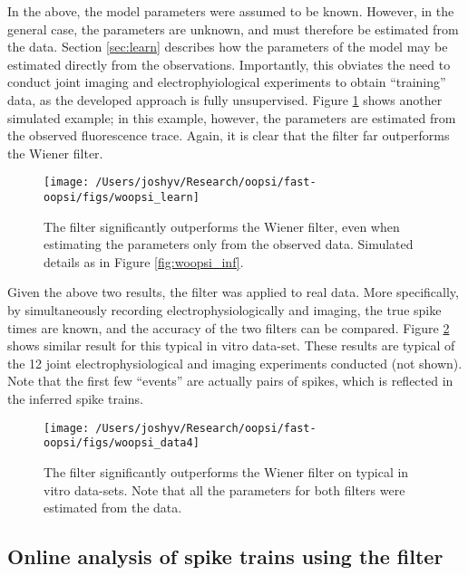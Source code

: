 In the above, the model parameters were assumed to be known.  However, in the general case, the parameters are unknown, and must therefore be estimated from the data.  Section \ref{sec:learn} describes how the parameters of the model may be estimated directly from the observations.  Importantly, this obviates the need to conduct joint imaging and electrophyiological experiments to obtain ``training'' data, as the developed approach is fully unsupervised.  Figure \ref{fig:woopsi_learn} shows another simulated example; in this example, however, the parameters are estimated from the observed fluorescence trace.  Again, it is clear that the \foopsi filter far outperforms the Wiener filter.

\begin{figure}[h!]
\centering \texttt{[image: /Users/joshyv/Research/oopsi/fast-oopsi/figs/woopsi\_learn]}
\caption[parameters may be estimated using the \foopsi filter]{The \foopsi filter significantly outperforms the Wiener filter, even when estimating the parameters only from the observed data.  Simulated details as in Figure \ref{fig:woopsi_inf}.} \label{fig:woopsi_learn}
\end{figure}

Given the above two results, the \foopsi filter was applied to real data.  More specifically, by simultaneously recording electrophysiologically and imaging, the true spike times are known, and the accuracy of the two filters can be compared.  Figure \ref{fig:woopsi_data} shows similar result for this typical in vitro data-set.  These results are typical of the 12 joint electrophysiological and imaging experiments conducted (not shown). Note that the first few ``events'' are actually pairs of spikes, which is reflected in the inferred spike trains.

\begin{figure}[h!]
\centering \texttt{[image: /Users/joshyv/Research/oopsi/fast-oopsi/figs/woopsi\_data4]}
\caption[\foopsi filter outperforms Wiener filter on real data]{The \foopsi filter significantly outperforms the Wiener filter on typical in vitro data-sets.  Note that all the parameters for both filters were estimated from the data.} \label{fig:woopsi_data}
\end{figure}

\subsection{Online analysis of spike trains using the \foopsi filter}

